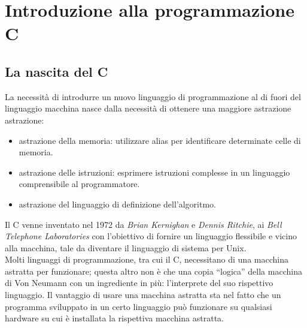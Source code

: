 \chapter{Introduzione alla programmazione C}

\section{La nascita del C}
La necessità di introdurre un nuovo linguaggio di programmazione al di fuori del linguaggio macchina nasce dalla necessità di ottenere una maggiore astrazione astrazione:
\begin{itemize}[noitemsep]
	\item astrazione della memoria: utilizzare alias per identificare determinate celle di memoria.
	\item astrazione delle istruzioni: esprimere istruzioni complesse in un linguaggio comprensibile al programmatore.
	\item astrazione del linguaggio di definizione dell'algoritmo.
\end{itemize}
Il C venne inventato nel 1972 da \textit{Brian Kernighan} e \textit{Dennis Ritchie}, ai \textit{Bell Telephone Laboratories} con l’obiettivo di fornire un linguaggio flessibile e vicino alla macchina, tale da diventare il linguaggio di sistema per Unix.\\
Molti linguaggi di programmazione, tra cui il C, necessitano di una macchina astratta per funzionare; questa altro non è che una copia “logica” della macchina di Von Neumann con un ingrediente in più: l’interprete del suo rispettivo linguaggio. Il vantaggio di usare una macchina astratta sta nel fatto che un programma sviluppato in un certo linguaggio può funzionare su qualsiasi hardware su cui è installata la rispettiva macchina astratta.

